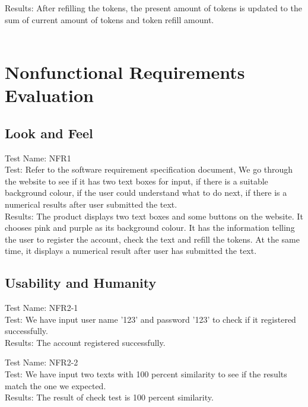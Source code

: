 \documentclass[12pt, titlepage]{article}
\begin{document}
	Results: After refilling the tokens, the present amount of tokens is updated to the sum of current amount of tokens and token refill amount. \\ \\
	


\section{Nonfunctional Requirements Evaluation}

    \subsection{Look and Feel}
    
    Test Name: NFR1\\
    
    Test: Refer to the software requirement specification document, We go through the website to see if it has two text boxes for input, if there is a suitable background colour, if the user could understand what to do next, if there is a numerical results after user submitted the text.\\
    
    Results: The product displays two text boxes and some buttons on the website. It chooses pink and purple as its background colour. It has the information telling the user to register the account, check the text and refill the tokens. At the same time, it displays a numerical result after user has submitted the text.
    
	\subsection{Usability and Humanity }
    
	Test Name: NFR2-1\\
	
	Test: We have input user name '123' and password '123' to check if it registered successfully.  \\
	
    Results: The account registered successfully.
    
    Test Name: NFR2-2\\
	
	Test: We have input two texts with 100 percent similarity to see if the results match the one we expected. \\
	
    Results: The result of check test is 100 percent similarity.
    
\end{document}
